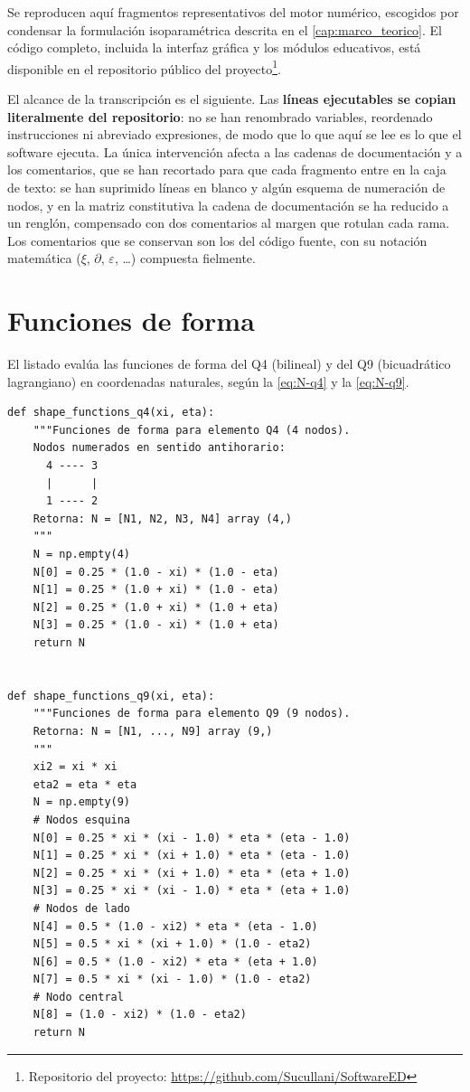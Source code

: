 Se reproducen aquí fragmentos representativos del motor numérico, escogidos por condensar la formulación isoparamétrica descrita en el \autoref{cap:marco_teorico}. El código completo, incluida la interfaz gráfica y los módulos educativos, está disponible en el repositorio público del proyecto\footnote{Repositorio del proyecto: \url{https://github.com/Sucullani/SoftwareED}}.

El alcance de la transcripción es el siguiente. Las \textbf{líneas ejecutables se copian literalmente del repositorio}: no se han renombrado variables, reordenado instrucciones ni abreviado expresiones, de modo que lo que aquí se lee es lo que el software ejecuta. La única intervención afecta a las cadenas de documentación y a los comentarios, que se han recortado para que cada fragmento entre en la caja de texto: se han suprimido líneas en blanco y algún esquema de numeración de nodos, y en la matriz constitutiva la cadena de documentación se ha reducido a un renglón, compensado con dos comentarios al margen que rotulan cada rama. Los comentarios que se conservan son los del código fuente, con su notación matemática ($\xi$, $\partial$, $\varepsilon$, \dots) compuesta fielmente.

\section{Funciones de forma}

El listado evalúa las funciones de forma del Q4 (bilineal) y del Q9 (bicuadrático lagrangiano) en coordenadas naturales, según la \autoref{eq:N-q4} y la \autoref{eq:N-q9}.

\begin{lstlisting}
def shape_functions_q4(xi, eta):
    """Funciones de forma para elemento Q4 (4 nodos).
    Nodos numerados en sentido antihorario:
      4 ---- 3
      |      |
      1 ---- 2
    Retorna: N = [N1, N2, N3, N4] array (4,)
    """
    N = np.empty(4)
    N[0] = 0.25 * (1.0 - xi) * (1.0 - eta)
    N[1] = 0.25 * (1.0 + xi) * (1.0 - eta)
    N[2] = 0.25 * (1.0 + xi) * (1.0 + eta)
    N[3] = 0.25 * (1.0 - xi) * (1.0 + eta)
    return N


def shape_functions_q9(xi, eta):
    """Funciones de forma para elemento Q9 (9 nodos).
    Retorna: N = [N1, ..., N9] array (9,)
    """
    xi2 = xi * xi
    eta2 = eta * eta
    N = np.empty(9)
    # Nodos esquina
    N[0] = 0.25 * xi * (xi - 1.0) * eta * (eta - 1.0)
    N[1] = 0.25 * xi * (xi + 1.0) * eta * (eta - 1.0)
    N[2] = 0.25 * xi * (xi + 1.0) * eta * (eta + 1.0)
    N[3] = 0.25 * xi * (xi - 1.0) * eta * (eta + 1.0)
    # Nodos de lado
    N[4] = 0.5 * (1.0 - xi2) * eta * (eta - 1.0)
    N[5] = 0.5 * xi * (xi + 1.0) * (1.0 - eta2)
    N[6] = 0.5 * (1.0 - xi2) * eta * (eta + 1.0)
    N[7] = 0.5 * xi * (xi - 1.0) * (1.0 - eta2)
    # Nodo central
    N[8] = (1.0 - xi2) * (1.0 - eta2)
    return N
\end{lstlisting}

